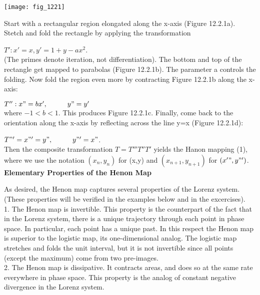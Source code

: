 \documentclass{article}
\newcommand\tab[1][1cm]{\hspace*{#1}}
\begin{document}
\texttt{[image: fig\_1221]}

Start with a rectangular region elongated along the x-axis (Figure 12.2.1a). Stetch and fold the rectangle by applying the transformation \\ \tab \tab

$T': x'=x, y'=1+y-ax^{2}$. \\

(The primes denote iteration, not differentiation). The bottom and top of the rectangle get mapped to parabolas (Figure 12.2.1b). The parameter a controls the folding. Now fold the region even more by contracting Figure 12.2.1b along the x-axis: \\ \tab \tab

$T'': x"=bx', \tab y"=y'$ \\

where $-1<b<1$. This produces Figure 12.2.1c. Finally, come back to the orientation along the x-axis by reflecting across the line y=x (Figure 12.2.1d): \\ \tab \tab

$T"'=x"'=y", \tab y"' = x"$. \\

Then the composite transformation $T=T''' T'' T'$ yields the Hanon mapping (1), where we use the notation $(x_{n}, y_{n})$ for (x,y) and $(x_{n+1},y_{n+1})$ for $(x'", y"')$. \\ 

\textbf {Elementary Properties of the Henon Map} \\ \tab

As desired, the Henon map captures several properties of the Lorenz system. (These properties will be verified in the examples below and in the excercises). \\ \tab \tab
1. The Henon map is invertible. This property is the counterpart of the fact that in the Lorenz system, there is a unique trajectory through each point in phase space. In particular, each point has a unique past. In this respect the Henon map is superior to the logistic map, its one-dimensional analog. The logistic map stretches and folds the unit interval, but it is not invertible since all points (except the maximum) come from two pre-images. \\ \tab \tab
2. The Henon map is dissipative. It contracts areas, and does so at the same rate everywhere in phase space. This property is the analog of constant negative divergence in the Lorenz system. \\ \tab \tab
\end{document}
